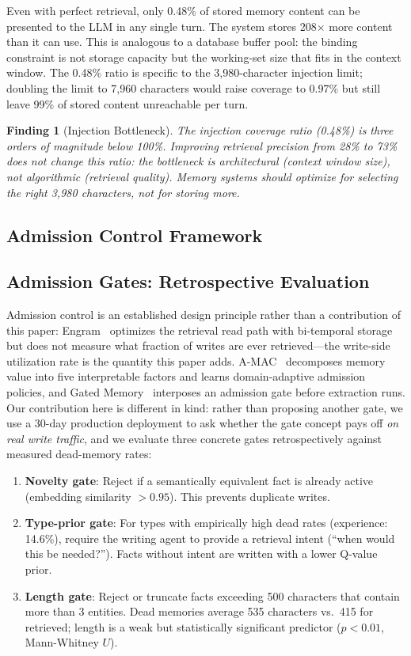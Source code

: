 \documentclass[sigconf,nonacm]{acmart}
\newtheorem{finding}{Finding}
\begin{document}
Even with perfect retrieval, only 0.48\% of stored memory content can be presented to the LLM in any single turn. The system stores 208$\times$ more content than it can use. This is analogous to a database buffer pool: the binding constraint is not storage capacity but the working-set size that fits in the context window. The 0.48\% ratio is specific to the 3,980-character injection limit; doubling the limit to 7,960 characters would raise coverage to 0.97\% but still leave 99\% of stored content unreachable per turn.

\begin{finding}[Injection Bottleneck]
The injection coverage ratio (0.48\%) is three orders of magnitude below 100\%. Improving retrieval precision from 28\% to 73\% does not change this ratio: the bottleneck is architectural (context window size), not algorithmic (retrieval quality). Memory systems should optimize for \emph{selecting the right 3,980 characters}, not for storing more.
\end{finding}

\subsection{Admission Control Framework}
\subsection{Admission Gates: Retrospective Evaluation}

Admission control is an established design principle rather than a contribution of this
paper: Engram~\cite{engram} optimizes the retrieval read path with bi-temporal storage but does not
measure what fraction of writes are ever retrieved---the write-side utilization rate is the
quantity this paper adds. A-MAC~\cite{amac} decomposes memory value into five interpretable factors and learns
domain-adaptive admission policies, and Gated Memory~\cite{gatedmem} interposes an admission
gate before extraction runs. Our contribution here is different in kind: rather than proposing
another gate, we use a 30-day production deployment to ask whether the gate concept pays off
\emph{on real write traffic}, and we evaluate three concrete gates retrospectively against
measured dead-memory rates:

\begin{enumerate}
\item \textbf{Novelty gate}: Reject if a semantically equivalent fact is already active (embedding similarity $> 0.95$). This prevents duplicate writes.
\item \textbf{Type-prior gate}: For types with empirically high dead rates (experience: 14.6\%), require the writing agent to provide a retrieval intent (``when would this be needed?''). Facts without intent are written with a lower Q-value prior.
\item \textbf{Length gate}: Reject or truncate facts exceeding 500 characters that contain more than 3 entities. Dead memories average 535 characters vs.\ 415 for retrieved; length is a weak but statistically significant predictor ($p < 0.01$, Mann-Whitney $U$).
\end{enumerate}
\end{document}

